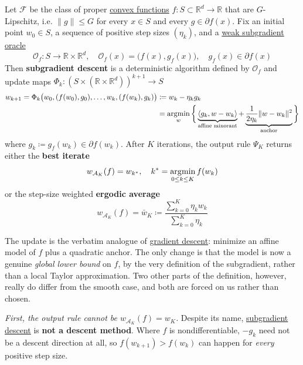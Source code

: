 	\begin{definition}
		\label{def:subgradient_descent}
		Let $\mathcal{F}$ be the class of proper \hyperref[mt-def:convex-function]{convex functions} $f: S \subset \mathbb{R}^d \to \mathbb{R}$ that are $G$-Lipschitz, i.e. $\|g\| \leq G$ for every $x \in S$ and every $g \in \partial f(x)$. Fix an initial point $w_0 \in S$, a sequence of positive step sizes $(\eta_k)$, and a \hyperref[def:weak_subgradient_oracle]{weak subgradient oracle}
		\begin{equation}
			\mathcal{O}_f : S \to \mathbb{R} \times \mathbb{R}^d, \quad \mathcal{O}_f (x) = \big( f(x), g_f(x) \big), \quad g_f(x) \in \partial f(x)
		\end{equation}
		Then \textbf{subgradient descent} is a deterministic algorithm defined by $\mathcal{O}_f$ and update maps $\Phi_k : (S \times (\mathbb{R} \times \mathbb{R}^d))^{k+1} \to S$
		\begin{align}
			w_{k+1} = \Phi_k \big( w_0, (f(w_0), g_0), \ldots, w_k, (f(w_k), g_k) \big)
				& \coloneqq w_k - \eta_k g_k \\
				& = \operatorname*{\arg\!\min}_w \bigg\{ \underbrace{\langle g_k, w - w_k \rangle}_{\text{affine minorant}} + \underbrace{\frac{1}{2\eta_k} \|w - w_k\|^2}_{\text{anchor}} \bigg\}
		\end{align}
		where $g_k \coloneqq g_f(w_k) \in \partial f(w_k)$. After $K$ iterations, the output rule $\Psi_K$ returns either the \textbf{best iterate}
		\begin{equation}
			w_{\mathcal{A}_K} (f) = w_{k^\ast}, \quad k^\ast = \operatorname*{\arg\!\min}_{0 \leq k \leq K} f(w_k)
		\end{equation}
		or the step-size weighted \textbf{ergodic average}
		\begin{equation}
			w_{\mathcal{A}_K} (f) = \bar{w}_K \coloneqq \frac{\sum_{k=0}^K \eta_k w_k}{\sum_{k=0}^K \eta_k}
		\end{equation}
	\end{definition}

	The update is the verbatim analogue of \hyperref[def:gradient_descent]{gradient descent}: minimize an affine model of $f$ plus a quadratic anchor. The only change is that the model is now a genuine \textit{global lower bound} on $f$, by the very definition of the subgradient, rather than a local Taylor approximation. Two other parts of the definition, however, really do differ from the smooth case, and both are forced on us rather than chosen.

	\textit{First, the output rule cannot be $w_{\mathcal{A}_K}(f) = w_K$.} Despite its name, \hyperref[def:subgradient_descent]{subgradient descent} is \textbf{not a descent method}. Where $f$ is nondifferentiable, $-g_k$ need not be a descent direction at all, so $f(w_{k+1}) > f(w_k)$ can happen for \textit{every} positive step size.

